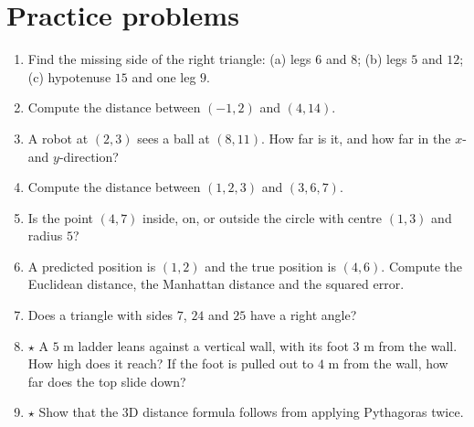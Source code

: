 \section*{Practice problems}
\begin{enumerate}[label=\textbf{\thechapter.\arabic*}]
  \item Find the missing side of the right triangle: (a) legs $6$ and $8$; (b) legs $5$ and $12$; (c) hypotenuse $15$ and one leg $9$.
  \item Compute the distance between $(-1,2)$ and $(4,14)$.
  \item A robot at $(2,3)$ sees a ball at $(8,11)$. How far is it, and how far in the $x$- and $y$-direction?
  \item Compute the distance between $(1,2,3)$ and $(3,6,7)$.
  \item Is the point $(4,7)$ inside, on, or outside the circle with centre $(1,3)$ and radius $5$?
  \item A predicted position is $(1,2)$ and the true position is $(4,6)$. Compute the Euclidean distance, the Manhattan distance and the squared error.
  \item Does a triangle with sides $7$, $24$ and $25$ have a right angle?
  \item $\star$ A $5$ m ladder leans against a vertical wall, with its foot $3$ m from the wall. How high does it reach? If the foot is pulled out to $4$ m from the wall, how far does the top slide down?
  \item $\star$ Show that the 3D distance formula follows from applying Pythagoras twice.
\end{enumerate}

